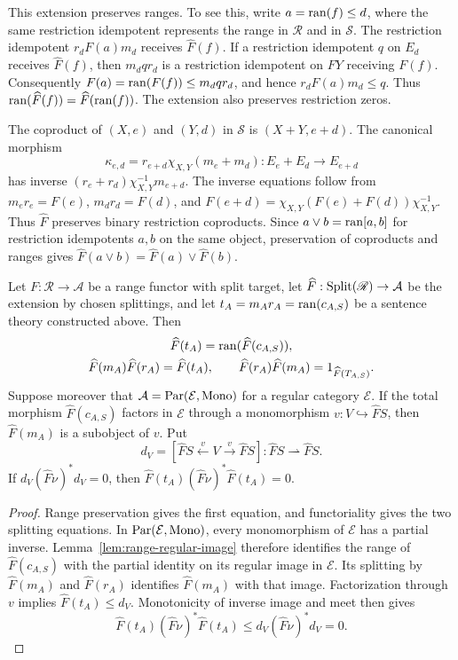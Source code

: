 This extension preserves ranges. To see this, write
$a=\operatorname{ran}(f)\le d$, where the same restriction idempotent represents
the range in $\mathscr R$ and in $\mathscr S$.
The restriction idempotent $r_d F(a)m_d$ receives
$\widehat F(f)$. If a restriction idempotent $q$ on $E_d$
receives $\widehat F(f)$, then $m_d q r_d$ is a restriction
idempotent on $FY$ receiving $F(f)$. Consequently
$F(a)=\operatorname{ran}(F(f))\le m_d q r_d$, and hence
$r_d F(a)m_d\le q$. Thus
$\operatorname{ran}(\widehat F(f))=\widehat F(\operatorname{ran}(f))$.
The extension also preserves restriction zeros.

The coproduct of $(X,e)$ and $(Y,d)$ in $\mathscr S$ is
$(X+Y,e+d)$. The canonical morphism
\[
 \kappa_{e,d}=r_{e+d}\chi_{X,Y}(m_e+m_d):
 E_e+E_d\longrightarrow E_{e+d}
\]
has inverse
$(r_e+r_d)\chi_{X,Y}^{-1}m_{e+d}$. The inverse equations follow
from $m_e r_e=F(e)$, $m_d r_d=F(d)$, and
$F(e+d)=\chi_{X,Y}(F(e)+F(d))\chi_{X,Y}^{-1}$.
Thus $\widehat F$ preserves binary restriction coproducts.
Since $a\vee b=\operatorname{ran}[a,b]$ for restriction idempotents $a,b$ on
the same object, preservation of coproducts and ranges gives
$\widehat F(a\vee b)=\widehat F(a)\vee\widehat F(b)$.

\begin{proposition}\label{prop:interpreted-theory}
Let $F:\mathscr R\to\mathcal A$ be a range functor with split
target, let $\widehat F:\operatorname{Split}(\mathscr R)\to\mathcal A$ be the
extension by chosen splittings, and let $t_A=m_A r_A=\operatorname{ran}(c_{A,S})$
be a sentence theory constructed above. Then
\begin{gather*}
 \widehat F(t_A)=\operatorname{ran}(\widehat F(c_{A,S})),\\
 \widehat F(m_A)\widehat F(r_A)=\widehat F(t_A),\qquad
 \widehat F(r_A)\widehat F(m_A)=1_{\widehat F(T_{A,S})}.
\end{gather*}
Suppose moreover that $\mathcal A=\operatorname{Par}(\mathcal E,\operatorname{Mono})$ for a
regular category $\mathcal E$. If the total morphism
$\widehat F(c_{A,S})$ factors in $\mathcal E$ through a
monomorphism $v:V\hookrightarrow\widehat F S$, then
$\widehat F(m_A)$ is a subobject of $v$. Put
\[
 d_V=[\widehat F S\xleftarrow{v}V\xrightarrow{v}\widehat F S]:
 \widehat F S\rightharpoonup\widehat F S.
\]
If $d_V(\widehat F\nu)^*d_V=0$, then
$\widehat F(t_A)(\widehat F\nu)^*\widehat F(t_A)=0$.
\end{proposition}
\begin{proof}
Range preservation gives the first equation, and functoriality
gives the two splitting equations. In $\operatorname{Par}(\mathcal E,\operatorname{Mono})$,
every monomorphism of $\mathcal E$ has a partial inverse.
Lemma~\ref{lem:range-regular-image} therefore identifies the range
of $\widehat F(c_{A,S})$ with the partial identity on its regular
image in $\mathcal E$. Its splitting by $\widehat F(m_A)$ and
$\widehat F(r_A)$ identifies $\widehat F(m_A)$ with that image.
Factorization through $v$ implies
$\widehat F(t_A)\le d_V$. Monotonicity of inverse image and meet
then gives
\[
 \widehat F(t_A)(\widehat F\nu)^*\widehat F(t_A)
 \le d_V(\widehat F\nu)^*d_V=0.
\]
\end{proof}


